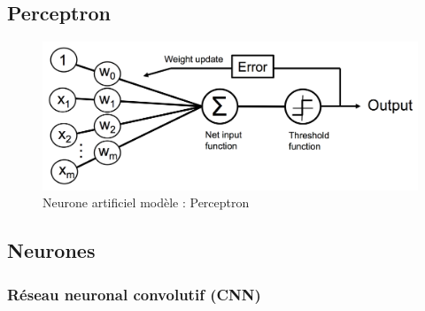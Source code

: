 	\subsection{Perceptron}
	\lipsum[1]
	\begin{figure}[hth]%
		\centering
		\includegraphics[width=\textwidth]{images/perceptron_neuron.png}
		\caption{Neurone artificiel modèle : Perceptron \cite[image de]{ml2008python}
		}
		\label{fig:perceptron_neuron}
	\end{figure}


	\subsection{Neurones}
	\lipsum[1]
	
	
	\subsubsection{Réseau neuronal convolutif (CNN)}
	\lipsum[1]
	
	
	
	
	

		